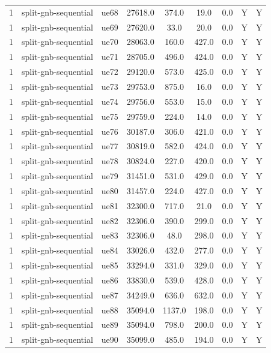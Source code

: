 \begin{table}[ht]
\begin{tabular}{|c|c|c|c|c|c|c|c|c|}
1 & split-gnb-sequential & ue68 & 27618.0 & 374.0 & 19.0 & 0.0 & Y & Y \\
1 & split-gnb-sequential & ue69 & 27620.0 & 33.0 & 20.0 & 0.0 & Y & Y \\
1 & split-gnb-sequential & ue70 & 28063.0 & 160.0 & 427.0 & 0.0 & Y & Y \\
1 & split-gnb-sequential & ue71 & 28705.0 & 496.0 & 424.0 & 0.0 & Y & Y \\
1 & split-gnb-sequential & ue72 & 29120.0 & 573.0 & 425.0 & 0.0 & Y & Y \\
1 & split-gnb-sequential & ue73 & 29753.0 & 875.0 & 16.0 & 0.0 & Y & Y \\
1 & split-gnb-sequential & ue74 & 29756.0 & 553.0 & 15.0 & 0.0 & Y & Y \\
1 & split-gnb-sequential & ue75 & 29759.0 & 224.0 & 14.0 & 0.0 & Y & Y \\
1 & split-gnb-sequential & ue76 & 30187.0 & 306.0 & 421.0 & 0.0 & Y & Y \\
1 & split-gnb-sequential & ue77 & 30819.0 & 582.0 & 424.0 & 0.0 & Y & Y \\
1 & split-gnb-sequential & ue78 & 30824.0 & 227.0 & 420.0 & 0.0 & Y & Y \\
1 & split-gnb-sequential & ue79 & 31451.0 & 531.0 & 429.0 & 0.0 & Y & Y \\
1 & split-gnb-sequential & ue80 & 31457.0 & 224.0 & 427.0 & 0.0 & Y & Y \\
1 & split-gnb-sequential & ue81 & 32300.0 & 717.0 & 21.0 & 0.0 & Y & Y \\
1 & split-gnb-sequential & ue82 & 32306.0 & 390.0 & 299.0 & 0.0 & Y & Y \\
1 & split-gnb-sequential & ue83 & 32306.0 & 48.0 & 298.0 & 0.0 & Y & Y \\
1 & split-gnb-sequential & ue84 & 33026.0 & 432.0 & 277.0 & 0.0 & Y & Y \\
1 & split-gnb-sequential & ue85 & 33294.0 & 331.0 & 329.0 & 0.0 & Y & Y \\
1 & split-gnb-sequential & ue86 & 33830.0 & 539.0 & 428.0 & 0.0 & Y & Y \\
1 & split-gnb-sequential & ue87 & 34249.0 & 636.0 & 632.0 & 0.0 & Y & Y \\
1 & split-gnb-sequential & ue88 & 35094.0 & 1137.0 & 198.0 & 0.0 & Y & Y \\
1 & split-gnb-sequential & ue89 & 35094.0 & 798.0 & 200.0 & 0.0 & Y & Y \\
1 & split-gnb-sequential & ue90 & 35099.0 & 485.0 & 194.0 & 0.0 & Y & Y \\

\end{tabular}
\end{table}

